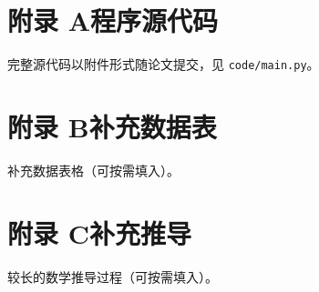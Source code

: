 \documentclass[a4paper, 12pt]{ctexart}
\begin{document}


\newpage
{}


\newpage
\thispagestyle{abstractstyle}
\tableofcontents

\newpage
{}










\newpage
\printbibliography[title={参考文献}]

\newpage
\appendix

\section{\texorpdfstring{附录 A\quad 程序源代码}{附录 A 程序源代码}}
% 
\noindent 完整源代码以附件形式随论文提交，见 \texttt{code/main.py}。

\section{\texorpdfstring{附录 B\quad 补充数据表}{附录 B 补充数据表}}
\noindent 补充数据表格（可按需填入）。

\section{\texorpdfstring{附录 C\quad 补充推导}{附录 C 补充推导}}
\noindent 较长的数学推导过程（可按需填入）。
\end{document}
